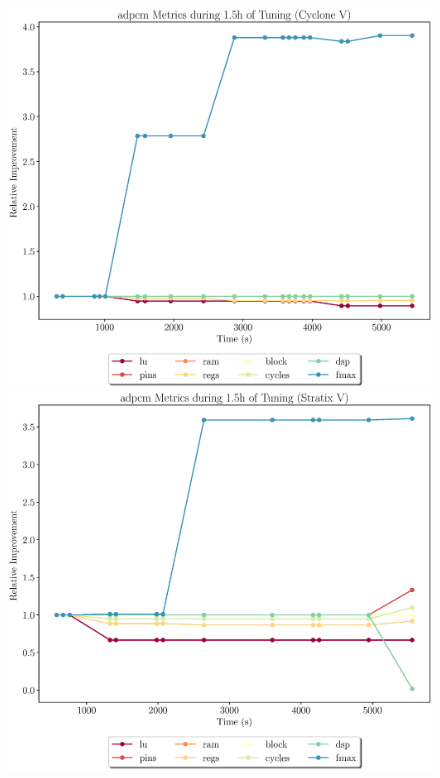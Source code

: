 \documentclass[12pt, a4paper]{article}
\begin{document}
\begin{figure}[htpb]
    \begin{minipage}{.48\textwidth}
        \includegraphics[scale=.29]{adpcm_all_5400_chstone_CycloneV}
    \end{minipage}%
    \hfill
    \begin{minipage}{.48\textwidth}
        \includegraphics[scale=.29]{adpcm_all_5400_chstone_StratixV}
    \end{minipage}%


\end{figure}
\end{document}
